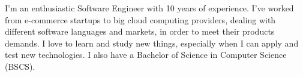 %
%
%

\par{
	I'm an enthusiastic Software Engineer with 10 years of experience.
	I've worked from e-commerce startups to big cloud computing providers,
	dealing with different software languages and markets, in order to meet their products demands.
	I love to learn and study new things, especially when I can apply and test new technologies.
	I also have a Bachelor of Science in Computer Science (BSCS).\\
}
